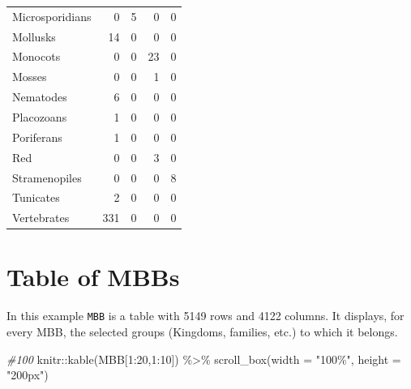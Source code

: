 \documentclass[
  letterpaper,
  DIV=11,
  numbers=noendperiod]{scrreprt}
\newenvironment{Shaded}{}{}
\newcommand{\AttributeTok}[1]{\textcolor[rgb]{0.78,0.47,0.87}{#1}}
\newcommand{\CommentTok}[1]{\textcolor[rgb]{0.36,0.39,0.44}{\textit{#1}}}
\newcommand{\DecValTok}[1]{\textcolor[rgb]{0.82,0.60,0.40}{#1}}
\newcommand{\FunctionTok}[1]{\textcolor[rgb]{0.38,0.69,0.94}{#1}}
\newcommand{\NormalTok}[1]{\textcolor[rgb]{0.67,0.70,0.75}{#1}}
\newcommand{\SpecialCharTok}[1]{\textcolor[rgb]{0.34,0.71,0.76}{#1}}
\newcommand{\StringTok}[1]{\textcolor[rgb]{0.60,0.76,0.47}{#1}}
\begin{document}
\begin{longtable*}[l]{lrrrr}
Microsporidians & 0 & 5 & 0 & 0\\
Mollusks & 14 & 0 & 0 & 0\\
Monocots & 0 & 0 & 23 & 0\\
\addlinespace
Mosses & 0 & 0 & 1 & 0\\
Nematodes & 6 & 0 & 0 & 0\\
Placozoans & 1 & 0 & 0 & 0\\
Poriferans & 1 & 0 & 0 & 0\\
Red & 0 & 0 & 3 & 0\\
\addlinespace
Stramenopiles & 0 & 0 & 0 & 8\\
Tunicates & 2 & 0 & 0 & 0\\
Vertebrates & 331 & 0 & 0 & 0\\
\bottomrule
\end{longtable*}

\section{Table of MBBs}\label{table-of-mbbs}

In this example \texttt{MBB} is a table with 5149 rows and 4122 columns.
It displays, for every MBB, the selected groups (Kingdoms, families,
etc.) to which it belongs.

\begin{Shaded}
\begin{Highlighting}[]
\CommentTok{\#100}
\NormalTok{knitr}\SpecialCharTok{::}\FunctionTok{kable}\NormalTok{(MBB[}\DecValTok{1}\SpecialCharTok{:}\DecValTok{20}\NormalTok{,}\DecValTok{1}\SpecialCharTok{:}\DecValTok{10}\NormalTok{]) }\SpecialCharTok{\%\textgreater{}\%}   
  \FunctionTok{scroll\_box}\NormalTok{(}\AttributeTok{width =} \StringTok{"100\%"}\NormalTok{, }\AttributeTok{height =} \StringTok{"200px"}\NormalTok{)}
\end{Highlighting}
\end{Shaded}
\end{document}
